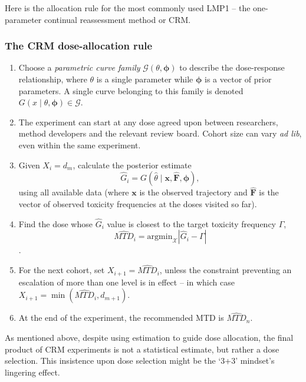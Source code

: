 Here is the allocation rule for the most commonly used LMP1 -- the one-parameter continual reassessment method or CRM.

\subsubsection{The CRM dose-allocation rule \citep{O'Qu:Pepe:Fish:cont:1990}}
\begin{enumerate}
\item Choose a \emph{parametric curve family} $\mathcal{G}\left(\theta,\boldsymbol{\phi}\right)$ to describe the dose-response relationship, where $\theta$ is a single parameter while $\boldsymbol{\phi}$ is a vector of prior parameters. A single curve belonging to this family is denoted\ $G\left(x\mid\theta,\boldsymbol{\phi}\right)\in\mathcal{G}$.
\item The experiment can start at any dose agreed upon between researchers, method developers and the relevant review board. Cohort size can vary \emph{ad lib}, even within the same experiment.
\item Given $X_i=d_m$, calculate the posterior estimate
$$\hat{G}_i=G\left(\hat{\theta}\mid \mathbf{x,\hat{F}},\boldsymbol{\phi}\right),$$
using all available data (where  $\mathbf{x}$ is the observed trajectory and $\mathbf{\hat{F}}$ is the vector of observed toxicity frequencies at the doses visited so far).
\item Find the dose whose $\hat{G}_i$ value is closest to the target toxicity frequency $\Gamma$, $$\widehat{MTD}_i=\mathrm{arg min}_{\mathcal{X}}\left|\hat{G}_i-\Gamma\right|$$.
\item For the next cohort, set $X_{i+1}=\widehat{MTD}_i$, unless the \cite{Good:Zahu:Pian:some:1995} constraint preventing an escalation of more than one level is in effect -- in which case $X_{i+1}=\min\left(\widehat{MTD}_i,d_{m+1}\right)$.
\item At the end of the experiment, the recommended MTD is $\widehat{MTD}_n$.
\end{enumerate}

\noindent As mentioned above, despite using estimation to guide dose allocation, the final product of CRM experiments is not a statistical estimate, but rather a dose selection. This insistence upon dose selection might be the `3+3' mindset's lingering effect.

